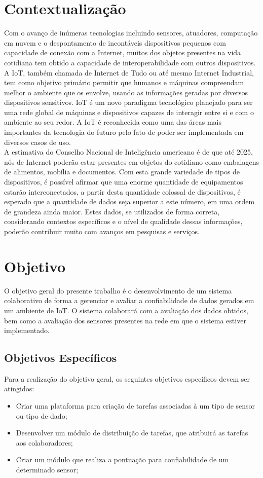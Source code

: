 \section{Contextualização}
\qquad
Com o avanço de inúmeras tecnologias incluindo sensores, atuadores, computação em nuvem e o despontamento de
incontáveis dispositivos pequenos com capacidade de conexão com a Internet, muitos dos objetos presentes
na vida cotidiana tem obtido a capacidade de interoperabilidade com outros dispositivos.
\\ \null
\qquad
A \acrfull{IoT}, também chamada de Internet de Tudo ou até mesmo Internet Industrial, tem como objetivo primário
permitir que humanos e máquinas compreendam melhor o ambiente que os envolve, usando as informações geradas por
diversos dispositivos sensitivos. \acrshort{IoT} é um novo paradigma tecnológico planejado para ser uma rede
global de máquinas e dispositivos capazes de interagir entre si e com o ambiente ao seu redor.
A \acrshort{IoT} é reconhecida como uma das áreas mais importantes da tecnologia do futuro pelo fato de
poder ser implementada em diversos casos de uso.
\\ \null
\qquad A estimativa do Conselho Nacional de Inteligência americano é de que até 2025, nós de Internet poderão estar presentes
em objetos do cotidiano como embalagens de alimentos, mobília e documentos. Com esta grande variedade de tipos de dispositivos,
é possível afirmar que uma enorme quantidade de equipamentos estarão interconectados, a partir desta quantidade
colossal de dispositivos, é esperado que a quantidade de dados seja superior a este número, em uma ordem de grandeza ainda maior.
Estes dados, se utilizados de forma correta, considerando contextos específicos e o nível de qualidade dessas informações, poderão
contribuir muito com avanços em pesquisas e serviços.
\section{Objetivo}
\qquad O objetivo geral do presente trabalho é o desenvolvimento de um sistema colaborativo de forma a gerenciar e avaliar a confiabilidade de dados
gerados em um ambiente de \acrlong{IoT}. O sistema colaborará com a avaliação dos dados obtidos, bem como a avaliação
dos sensores presentes na rede em que o sistema estiver implementado.
\subsection{Objetivos Específicos}
Para a realização do objetivo geral, os seguintes objetivos específicos devem ser atingidos:
\begin{itemize}
  \item Criar uma plataforma para criação de tarefas associadas à um tipo de sensor ou tipo de dado;
  \item Desenvolver um módulo de distribuição de tarefas, que atribuirá as tarefas aos colaboradores;
  \item Criar um módulo que realiza a pontuação para confiabilidade de um determinado sensor;
\end{itemize}
